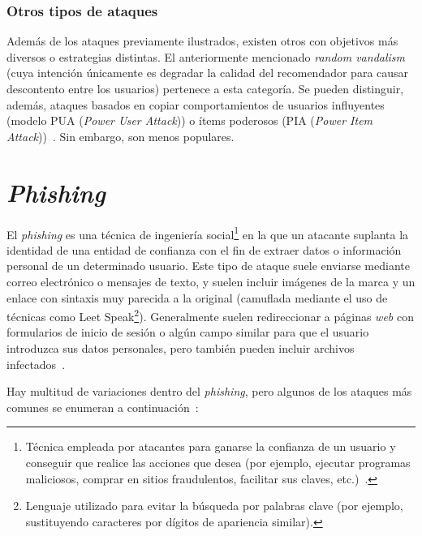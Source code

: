 \subsubsection{Otros tipos de ataques}

Además de los ataques previamente ilustrados, existen otros con objetivos más diversos o estrategias distintas. El anteriormente mencionado \textit{random vandalism} (cuya intención únicamente es degradar la calidad del recomendador para causar descontento entre los usuarios) pertenece a esta categoría. Se pueden distinguir, además, ataques basados en copiar comportamientos de usuarios influyentes (modelo PUA (\textit{Power User Attack})) o ítems poderosos (PIA (\textit{Power Item Attack}))~\cite{mingdan2018ShillingAttacksAReview}. Sin embargo, son menos populares.


\section{\textit{Phishing}}

El \textit{phishing} es una técnica de ingeniería social\footnote{Técnica empleada por atacantes para ganarse la confianza de un usuario y conseguir que realice las acciones que desea (por ejemplo, ejecutar programas maliciosos, comprar en sitios fraudulentos, facilitar sus claves, etc.)~\cite{ingenieriaSocialINCIBE}.} en la que un atacante suplanta la identidad de una entidad de confianza con el fin de extraer datos o información personal de un determinado usuario. Este tipo de ataque suele enviarse mediante correo electrónico o mensajes de texto, y suelen incluir imágenes de la marca y un enlace con sintaxis muy parecida a la original (camuflada mediante el uso de técnicas como Leet Speak\footnote{Lenguaje utilizado para evitar la búsqueda por palabras clave (por ejemplo, sustituyendo caracteres por dígitos de apariencia similar).}). Generalmente suelen redireccionar a páginas \textit{web} con formularios de inicio de sesión o algún campo similar para que el usuario introduzca sus datos personales, pero también pueden incluir archivos infectados~\cite{phishingBBVA}.

Hay multitud de variaciones dentro del \textit{phishing}, pero algunos de los ataques más comunes se enumeran a continuación~\cite{phishingKeeperSecurity}: 


